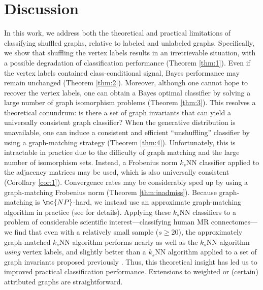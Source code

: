 \documentclass[10pt,journal,cspaper,compsoc]{IEEEtran}
\begin{document}
\section{Discussion}

In this work, we address both the theoretical and practical limitations of classifying shuffled graphs, relative to labeled and unlabeled graphs.  Specifically, we show that shuffling the vertex labels results in an irretrievable situation, with a possible degradation of classification performance (Theorem \ref{thm:1}). Even if the vertex labels contained class-conditional signal, Bayes performance may remain unchanged (Theorem \ref{thm:2}).  Moreover, although one cannot hope to recover the vertex labels, one can obtain a Bayes optimal classifier by solving a large number of graph isomorphism problems (Theorem \ref{thm:3}).  This resolves a theoretical conundrum: is there a set of graph invariants that can yield a universally consistent graph classifier?  When the generative distribution is unavailable, one can induce a consistent and efficient ``unshuffling'' classifier by using a graph-matching strategy (Theorem \ref{thm:4}).  Unfortunately, this is intractable in practice due to the difficulty of graph matching and the large number of isomorphism sets.  Instead, a Frobenius norm $k_s$NN classifier applied to the adjacency matrices may be used, which is also universally consistent (Corollary \ref{cor:1}).   Convergence rates may be considerably sped up by using a graph-matching Frobenius norm (Theorem \ref{thm:inadmiss}).  Because graph-matching is $\mc{NP}$-hard, we instead use an approximate graph-matching algorithm in practice (see \cite{VP11_QAP} for details).  Applying these $k_s$NN classifiers to a problem of considerable scientific interest---classifying human MR connectomes---we find that even with a relatively small sample ($s \geq 20$), the approximately graph-matched $k_s$NN algorithm performs nearly as well as the $k_s$NN algorithm \emph{using} vertex labels, and slightly better than a $k_s$NN algorithm applied to a set of graph invariants proposed previously \cite{PCP10}.  Thus, this theoretical insight has led us to improved practical classification performance.  Extensions to weighted or (certain) attributed graphs are straightforward.
\end{document}
